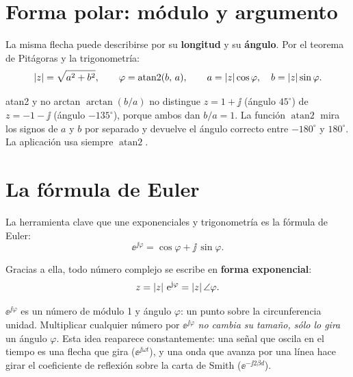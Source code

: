 \section{Forma polar: módulo y argumento}

La misma flecha puede describirse por su \textbf{longitud} y su \textbf{ángulo}. Por el teorema de Pitágoras y la trigonometría:
\begin{equation}
  \left|z\right| = \sqrt{a^2 + b^2}, \qquad \varphi = \operatorname{atan2}(b,\,a), \qquad a = \left|z\right|\cos\varphi, \quad b = \left|z\right|\sin\varphi .
\end{equation}
\begin{donde}
\end{donde}

\begin{atencion}{atan2 y no arctan}
$\arctan(b/a)$ no distingue $z = 1+\jj$ (ángulo $45^\circ$) de $z = -1-\jj$ (ángulo $-135^\circ$), porque ambos dan $b/a = 1$.
La función $\operatorname{atan2}$ mira los signos de $a$ y $b$ por separado y devuelve el ángulo correcto entre $-180^\circ$ y $180^\circ$.
La aplicación usa siempre $\operatorname{atan2}$.
\end{atencion}

\section{La fórmula de Euler}

La herramienta clave que une exponenciales y trigonometría es la fórmula de Euler:
\begin{equation}
  \ee^{\jj\varphi} = \cos\varphi + \jj\,\sin\varphi .
\end{equation}
\begin{donde}
\end{donde}
Gracias a ella, todo número complejo se escribe en \textbf{forma exponencial}:
\begin{equation}
  z = \left|z\right|\,\mathrm{e}^{\mathrm{j}\varphi} = \left|z\right|\angle\varphi .
\end{equation}

\begin{intuicion}
$\ee^{\jj\varphi}$ es un número de módulo 1 y ángulo $\varphi$: un punto sobre la circunferencia unidad. Multiplicar cualquier número
por $\ee^{\jj\varphi}$ \emph{no cambia su tamaño, sólo lo gira} un ángulo $\varphi$. Esta idea reaparece constantemente: una señal
que oscila en el tiempo es una flecha que gira ($\ee^{\jj\omega t}$), y una onda que avanza por una línea hace girar el coeficiente
de reflexión sobre la carta de Smith ($\ee^{-\jj2\beta d}$).
\end{intuicion}

